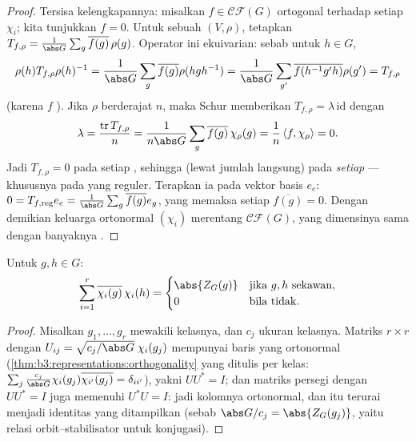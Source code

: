 \begin{proof}
Tersisa kelengkapannya: misalkan $f \in \mathcal{CF}(G)$
ortogonal terhadap setiap $\chi_i$; kita tunjukkan $f = 0$. Untuk sebuah
 $(V,\rho)$, tetapkan $T_{f,\rho} = \frac{1}{\abs G}
\sum_g \overline{f(g)}\,\rho(g)$. Operator ini ekuivarian: sebab untuk $h \in
G$,
\[
\rho(h)T_{f,\rho}\rho(h)^{-1} = \frac1{\abs G}\sum_g
\overline{f(g)}\rho(hgh^{-1})
= \frac1{\abs G}\sum_{g'}\overline{f(h^{-1}g'h)}\rho(g') =
T_{f,\rho}
\]
(karena $f$ ). Jika $\rho$  berderajat
$n$, maka Schur memberikan $T_{f,\rho} = \lambda\,\mathrm{id}$ dengan
\[
\lambda = \frac{\operatorname{tr}T_{f,\rho}}{n}
= \frac{1}{n\abs G}\sum_g \overline{f(g)}\,\chi_\rho(g)
= \frac1n\,\langle f, \chi_\rho\rangle = 0 .
\]
Jadi $T_{f,\rho} = 0$ pada setiap , sehingga (lewat jumlah langsung) pada
\emph{setiap}  --- khususnya pada yang reguler.
Terapkan ia pada vektor basis $e_e$: $0 = T_{f,\mathrm{reg}}e_e =
\frac1{\abs G}\sum_g\overline{f(g)}e_g$, yang memaksa setiap
$\overline{f(g)} = 0$. Dengan demikian keluarga ortonormal
$(\chi_i)$ merentang $\mathcal{CF}(G)$, yang dimensinya sama dengan
banyaknya .
\end{proof}

\begin{corollary}
\label{cor:b3:representations:column}
Untuk $g, h \in G$:
\[
\sum_{i=1}^{r}\overline{\chi_i(g)}\,\chi_i(h) =
\begin{cases}
\abs{Z_G(g)} & \text{jika } g, h \text{ sekawan},\\
0 & \text{bila tidak.}
\end{cases}
\]
\end{corollary}

\begin{proof}
Misalkan $g_1, \dots, g_r$ mewakili kelasnya, dan $c_j$ ukuran
kelasnya. Matriks $r \times r$ dengan $U_{ij} =
\sqrt{c_j/\abs G}\;\chi_i(g_j)$ mempunyai baris yang ortonormal
(\cref{thm:b3:representations:orthogonality} yang ditulis per kelas:
$\sum_j \frac{c_j}{\abs G}\chi_i(g_j)\overline{\chi_{i'}(g_j)} =
\delta_{ii'}$), yakni $UU^* = I$; dan matriks persegi dengan $UU^* =
I$ juga memenuhi $U^*U = I$: jadi kolomnya ortonormal, dan itu terurai menjadi
identitas yang ditampilkan (sebab $\abs G/c_j = \abs{Z_G(g_j)}$, yaitu
relasi orbit--stabilisator untuk konjugasi).
\end{proof}

